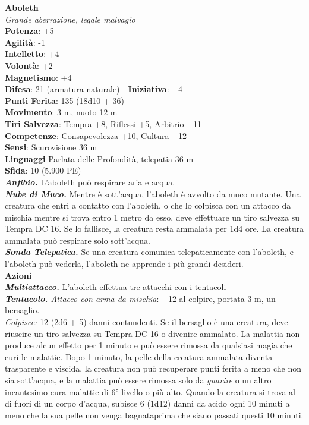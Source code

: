 \begin{multicols}{2}

\textbf{Aboleth}\\
\emph{Grande aberrazione, legale malvagio}\\
\textbf{Potenza}: +5\\
\textbf{Agilità}: -1\\
\textbf{Intelletto}: +4\\
\textbf{Volontà}: +2\\
\textbf{Magnetismo}: +4\\
\textbf{Difesa}: 21 (armatura naturale) - \textbf{Iniziativa}: +4\\
\textbf{Punti Ferita}: 135 (18d10 + 36)\\
\textbf{Movimento}: 3 m, nuoto 12 m\\
\textbf{Tiri Salvezza}: Tempra +8, Riflessi +5, Arbitrio +11\\
\textbf{Competenze}: Consapevolezza +10, Cultura +12\\
\textbf{Sensi}: Scurovisione 36 m\\
\textbf{Linguaggi} Parlata delle Profondità, telepatia 36 m\\
\textbf{Sfida}: 10 (5.900 PE)\\
\smallskip
\emph{\textbf{Anfibio.}} L'aboleth può respirare aria e acqua.\\
\emph{\textbf{Nube di Muco.}} Mentre è sott'acqua, l'aboleth è avvolto da muco mutante. Una creatura che entri a contatto con l'aboleth, o che lo colpisca con un attacco da mischia mentre si trova entro 1 metro da esso, deve effettuare un tiro salvezza su Tempra DC  16. Se lo fallisce, la creatura resta ammalata per 1d4 ore. La creatura ammalata può respirare solo sott'acqua.\\
\emph{\textbf{Sonda Telepatica.}} Se una creatura comunica telepaticamente con l'aboleth, e l'aboleth può vederla, l'aboleth ne apprende i più grandi desideri. \\
\smallskip\textbf{Azioni}\\
\emph{\textbf{Multiattacco.}} L'aboleth effettua tre attacchi con i tentacoli\\
\emph{\textbf{Tentacolo.} Attacco con arma da mischia}: +12 al colpire, portata 3 m, un bersaglio.\\
\emph{Colpisce:} 12 (2d6 + 5) danni contundenti. Se il bersaglio è una creatura, deve riuscire un tiro salvezza su Tempra DC  16 o divenire ammalato. La malattia non produce alcun effetto per 1 minuto e può essere rimossa da qualsiasi magia che curi le malattie. Dopo 1 minuto, la pelle della creatura ammalata diventa trasparente e viscida, la creatura non può recuperare punti ferita a meno che non sia sott'acqua, e la malattia può essere rimossa solo da \emph{guarire} o un altro incantesimo cura malattie di 6° livello o più alto. Quando la creatura si trova al di fuori di un corpo d'acqua, subisce 6 (1d12) danni da acido ogni 10 minuti a meno che la sua pelle non venga bagnataprima che siano  passati questi 10 minuti. \\

\end{multicols}
